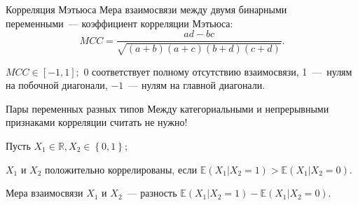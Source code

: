\documentclass[9pt,pdf,utf8,hyperref={unicode},aspectratio=169]{beamer}
\begin{document}
\begin{frame}{Корреляция Мэтьюса}
	Мера взаимосвязи между двумя бинарными переменными~--- коэффициент корреляции Мэтьюса:
	$$MCC = \frac{ad-bc}{\sqrt{(a+b)(a+c)(b+d)(c+d)}}.$$
	
	$MCC\in[-1,1];$ 0 соответствует полному отсутствию взаимосвязи, 1~---~нулям на побочной диагонали, $-1$~--- нулям на главной диагонали.
\end{frame}

	\begin{frame}{Пары переменных разных типов}
	Между категориальными и непрерывными признаками корреляции считать не нужно!
	
	\bigskip
	
	Пусть $X_1\in \mathbb{R}, X_2\in\left\{0,1\right\};$ 
	
	$X_1$ и $X_2$ положительно коррелированы, если $\mathbb{E}\left(X_1\left.\right|X_2=1\right) > \mathbb{E}\left(X_1\left.\right|X_2=0\right)$.
	
	\bigskip
	
	Мера взаимосвязи $X_1$ и $X_2$~--- разность $\mathbb{E}\left(X_1\left.\right|X_2=1\right) - \mathbb{E}\left(X_1\left.\right|X_2=0\right)$.
\end{frame}
\end{document}
